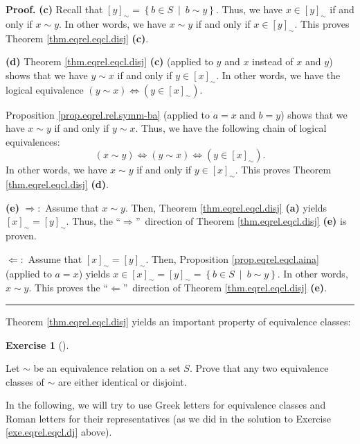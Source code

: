\documentclass[numbers=enddot,12pt,final,onecolumn,notitlepage]{scrartcl}%
\newcounter{exer}
\numberwithin{exer}{subsection}
\theoremstyle{definition}
\newtheorem{exmp}[exer]{Exercise}
\newenvironment{exercise}[1][]
{\begin{exmp}[#1]\begin{leftbar}}
{\end{leftbar}\end{exmp}}
\newenvironment{proof}[1][Proof]{\noindent\textbf{#1.} }{\ \rule{0.5em}{0.5em}}
\begin{document}
\begin{proof}
\textbf{(c)} Recall that $\left[  y\right]  _{\sim}=\left\{  b\in
S\ \mid\ b\sim y\right\}  $. Thus, we have $x\in\left[  y\right]  _{\sim}$ if
and only if $x\sim y$. In other words, we have $x\sim y$ if and only if
$x\in\left[  y\right]  _{\sim}$. This proves Theorem \ref{thm.eqrel.eqcl.disj}
\textbf{(c)}.

\textbf{(d)} Theorem \ref{thm.eqrel.eqcl.disj} \textbf{(c)} (applied to $y$
and $x$ instead of $x$ and $y$) shows that we have $y\sim x$ if and only if
$y\in\left[  x\right]  _{\sim}$. In other words, we have the logical
equivalence $\left(  y\sim x\right)  \Longleftrightarrow\left(  y\in\left[
x\right]  _{\sim}\right)  $.

Proposition \ref{prop.eqrel.rel.symm-ba} (applied to $a=x$ and $b=y$) shows
that we have $x\sim y$ if and only if $y\sim x$. Thus, we have the following
chain of logical equivalences:
\[
\left(  x\sim y\right)  \Longleftrightarrow\left(  y\sim x\right)
\Longleftrightarrow\left(  y\in\left[  x\right]  _{\sim}\right)  .
\]
In other words, we have $x\sim y$ if and only if $y\in\left[  x\right]
_{\sim}$. This proves Theorem \ref{thm.eqrel.eqcl.disj} \textbf{(d)}.

\textbf{(e)} $\Longrightarrow:$ Assume that $x\sim y$. Then, Theorem
\ref{thm.eqrel.eqcl.disj} \textbf{(a)} yields $\left[  x\right]  _{\sim
}=\left[  y\right]  _{\sim}$. Thus, the \textquotedblleft$\Longrightarrow
$\textquotedblright\ direction of Theorem \ref{thm.eqrel.eqcl.disj}
\textbf{(e)} is proven.

$\Longleftarrow:$ Assume that $\left[  x\right]  _{\sim}=\left[  y\right]
_{\sim}$. Then, Proposition \ref{prop.eqrel.eqcl.aina} (applied to $a=x$)
yields $x\in\left[  x\right]  _{\sim}=\left[  y\right]  _{\sim}=\left\{  b\in
S\ \mid\ b\sim y\right\}  $. In other words, $x\sim y$. This proves the
\textquotedblleft$\Longleftarrow$\textquotedblright\ direction of Theorem
\ref{thm.eqrel.eqcl.disj} \textbf{(e)}.
\end{proof}

Theorem \ref{thm.eqrel.eqcl.disj} yields an important property of equivalence classes:

\begin{exercise}
\label{exe.eqrel.eqcl.dj}Let $\sim$ be an equivalence relation on a set $S$.
Prove that any two equivalence classes of $\sim$ are either identical or disjoint.
\end{exercise}

In the following, we will try to use Greek letters for equivalence classes and
Roman letters for their representatives (as we did in the solution to Exercise
\ref{exe.eqrel.eqcl.dj} above).
\end{document}
